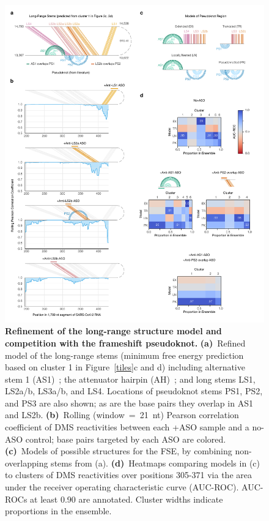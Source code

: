 \documentclass[main.tex]{subfiles}
\begin{document}
\begin{figure}[H]
	\includegraphics[width=\textwidth]{../MainFigures/lnas/lnas.pdf}
	\caption{\textbf{Refinement of the long-range structure model and competition with the frameshift pseudoknot.} \textbf{(a)}~Refined model of the long-range stems (minimum free energy prediction based on cluster 1 in Figure~\ref{tiles}c and d) including alternative stem 1 (AS1)~\cite{Lan2022}; the attenuator hairpin (AH)~\cite{Su2005}; and long stems LS1, LS2a/b, LS3a/b, and LS4. Locations of pseudoknot stems PS1, PS2, and PS3 are also shown; as are the base pairs they overlap in AS1 and LS2b. \textbf{(b)}~Rolling (window~=~21~nt) Pearson correlation coefficient of DMS reactivities between each +ASO sample and a no-ASO control; base pairs targeted by each ASO are colored. \textbf{(c)}~Models of possible structures for the FSE, by combining non-overlapping stems from (a). \textbf{(d)}~Heatmaps comparing models in (c) to clusters of DMS reactivities over positions 305-371 via the area under the receiver operating characteristic curve (AUC-ROC). AUC-ROCs at least 0.90 are annotated. Cluster widths indicate proportions in the ensemble.}
	\label{lnas}
\end{figure}
\end{document}

